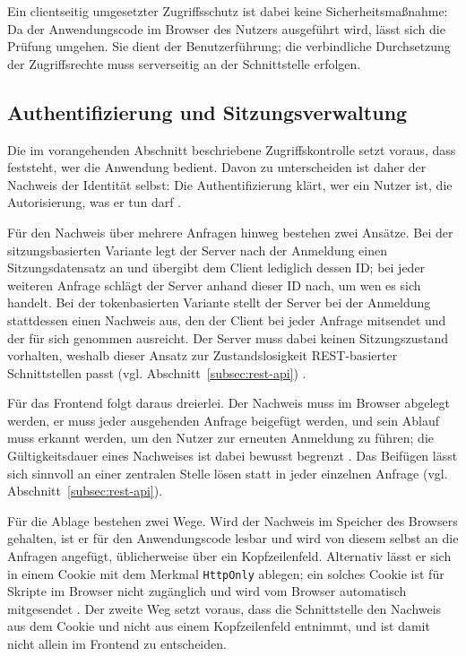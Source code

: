 Ein clientseitig umgesetzter Zugriffsschutz ist dabei keine
Sicherheitsmaßnahme: Da der Anwendungscode im Browser des Nutzers
ausgeführt wird, lässt sich die Prüfung umgehen. Sie dient der
Benutzerführung; die verbindliche Durchsetzung der Zugriffsrechte
muss serverseitig an der Schnittstelle erfolgen.


\subsection{Authentifizierung und Sitzungsverwaltung}
\label{subsec:authentifizierung}

Die im vorangehenden Abschnitt beschriebene Zugriffskontrolle setzt
voraus, dass feststeht, wer die Anwendung bedient. Davon zu
unterscheiden ist daher der Nachweis der Identität selbst: Die
Authentifizierung klärt, wer ein Nutzer ist, die Autorisierung, was er
tun darf \cite{ferraiolo_rbac_arxiv}.

Für den Nachweis über mehrere Anfragen hinweg bestehen zwei Ansätze.
Bei der sitzungsbasierten Variante legt der Server nach der Anmeldung
einen Sitzungsdatensatz an und übergibt dem Client lediglich dessen
ID; bei jeder weiteren Anfrage schlägt der Server anhand dieser
ID nach, um wen es sich handelt. Bei der tokenbasierten Variante
stellt der Server bei der Anmeldung stattdessen einen Nachweis aus,
den der Client bei jeder Anfrage mitsendet und der für sich genommen
ausreicht. Der Server muss dabei keinen Sitzungszustand vorhalten,
weshalb dieser Ansatz zur Zustandslosigkeit \acs{REST}-basierter
Schnittstellen passt (vgl. Abschnitt~\ref{subsec:rest-api})
\cite{fielding_rest}.

Für das Frontend folgt daraus dreierlei. Der Nachweis muss im Browser
abgelegt werden, er muss jeder ausgehenden Anfrage beigefügt werden,
und sein Ablauf muss erkannt werden, um den Nutzer zur erneuten
Anmeldung zu führen; die Gültigkeitsdauer eines Nachweises ist dabei
bewusst begrenzt \cite{nist_digital_identity}. Das Beifügen lässt sich
sinnvoll an einer zentralen Stelle lösen statt in jeder einzelnen
Anfrage (vgl. Abschnitt~\ref{subsec:rest-api}).

Für die Ablage bestehen zwei Wege. Wird der Nachweis im Speicher des
Browsers gehalten, ist er für den Anwendungscode lesbar und wird von
diesem selbst an die Anfragen angefügt, üblicherweise über ein
Kopfzeilenfeld. Alternativ lässt er sich in einem Cookie mit dem
Merkmal \texttt{HttpOnly} ablegen; ein solches Cookie ist für Skripte
im Browser nicht zugänglich und wird vom Browser automatisch
mitgesendet \cite{rfc6265}. Der zweite Weg setzt voraus, dass die
Schnittstelle den Nachweis aus dem Cookie und nicht aus einem
Kopfzeilenfeld entnimmt, und ist damit nicht allein im Frontend zu
entscheiden.

